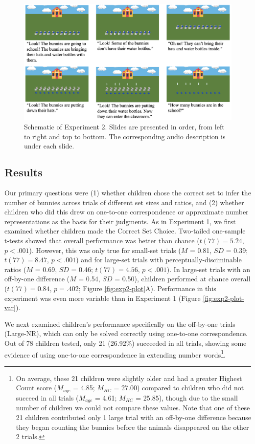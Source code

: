\documentclass[
  man,floatsintext]{apa7}
\begin{document}
\begin{figure}[h]

{\centering \includegraphics[width=1\linewidth]{figs/exp2} 

}

\caption{Schematic of Experiment 2. Slides are presented in order, from left to right and top to bottom. The corresponding audio description is under each slide.}\label{fig:exp2-figure}
\end{figure}

\subsection{Results}\label{results-1}

Our primary questions were (1) whether children chose the correct set to infer the number of bunnies across trials of different set sizes and ratios, and (2) whether children who did this drew on one-to-one correspondence or approximate number representations as the basis for their judgments. As in Experiment 1, we first examined whether children made the Correct Set Choice. Two-tailed one-sample t-tests showed that overall performance was better than chance (\(t(77) = 5.24\), \(p < .001\)).
However, this was only true for small-set trials (\(M\) = 0.81, \(SD\) = 0.39; \(t(77) = 8.47\), \(p < .001\)) and for large-set trials with perceptually-disciminable ratios (\(M\) = 0.69, \(SD\) = 0.46; \(t(77) = 4.56\), \(p < .001\)). In large-set trials with an off-by-one difference (\(M\) = 0.54, \(SD\) = 0.50), children performed at chance overall (\(t(77) = 0.84\), \(p = .402\); Figure \ref{fig:exp2-plot}A). Performance in this experiment was even more variable than in Experiment 1 (Figure \ref{fig:exp2-plot-var}).

We next examined children's performance specifically on the off-by-one trials (Large-NR), which can only be solved correctly using one-to-one correspondence. Out of 78 children tested, only 21 (26.92\%) succeeded in all trials, showing some evidence of using one-to-one correspondence in extending number words\footnote{On average, these 21 children were slightly older and had a greater Highest Count score (\(M_{age}\) = 4.85; \(M_{HC}\) = 27.00) compared to children who did not succeed in all trials (\(M_{age}\) = 4.61; \(M_{HC}\) = 25.85), though due to the small number of children we could not compare these values. Note that one of these 21 children contributed only 1 large trial with an off-by-one difference because they began counting the bunnies before the animals disappeared on the other 2 trials.}.
\end{document}
